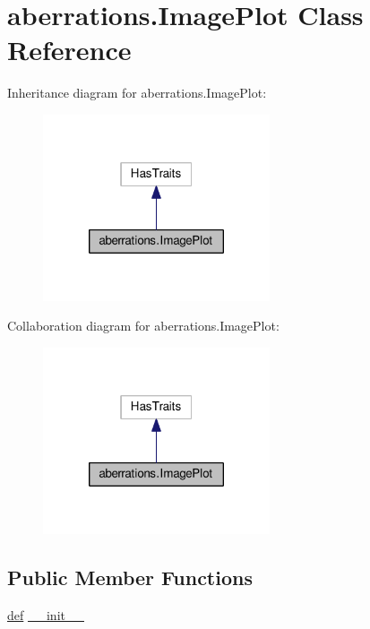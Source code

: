 \hypertarget{classaberrations_1_1_image_plot}{\section{aberrations.\-Image\-Plot Class Reference}
\label{classaberrations_1_1_image_plot}
}


Inheritance diagram for aberrations.\-Image\-Plot\-:
\nopagebreak
\begin{figure}[H]
\begin{center}
\leavevmode
\includegraphics[width=190pt]{classaberrations_1_1_image_plot__inherit__graph}
\end{center}
\end{figure}


Collaboration diagram for aberrations.\-Image\-Plot\-:
\nopagebreak
\begin{figure}[H]
\begin{center}
\leavevmode
\includegraphics[width=190pt]{classaberrations_1_1_image_plot__coll__graph}
\end{center}
\end{figure}
\subsection*{Public Member Functions}
\begin{DoxyCompactItemize}
\item 
\hyperlink{sim_image_from_wave_8m_a72b6b8e83430abf007f20aeae4dc2f74}{def} \hyperlink{classaberrations_1_1_image_plot_a59da70c464b92daadfeb611e0cbf8286}{\-\_\-\-\_\-init\-\_\-\-\_\-}
\end{DoxyCompactItemize}

